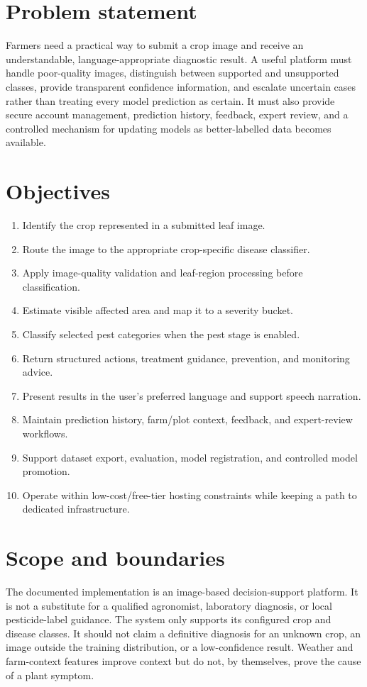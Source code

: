 \documentclass[12pt,a4paper,oneside,openany]{report}
\begin{document}
\section{Problem statement}
Farmers need a practical way to submit a crop image and receive an understandable, language-appropriate diagnostic result. A useful platform must handle poor-quality images, distinguish between supported and unsupported classes, provide transparent confidence information, and escalate uncertain cases rather than treating every model prediction as certain. It must also provide secure account management, prediction history, feedback, expert review, and a controlled mechanism for updating models as better-labelled data becomes available.

\section{Objectives}
\begin{enumerate}
  \item Identify the crop represented in a submitted leaf image.
  \item Route the image to the appropriate crop-specific disease classifier.
  \item Apply image-quality validation and leaf-region processing before classification.
  \item Estimate visible affected area and map it to a severity bucket.
  \item Classify selected pest categories when the pest stage is enabled.
  \item Return structured actions, treatment guidance, prevention, and monitoring advice.
  \item Present results in the user's preferred language and support speech narration.
  \item Maintain prediction history, farm/plot context, feedback, and expert-review workflows.
  \item Support dataset export, evaluation, model registration, and controlled model promotion.
  \item Operate within low-cost/free-tier hosting constraints while keeping a path to dedicated infrastructure.
\end{enumerate}

\section{Scope and boundaries}
The documented implementation is an image-based decision-support platform. It is not a substitute for a qualified agronomist, laboratory diagnosis, or local pesticide-label guidance. The system only supports its configured crop and disease classes. It should not claim a definitive diagnosis for an unknown crop, an image outside the training distribution, or a low-confidence result. Weather and farm-context features improve context but do not, by themselves, prove the cause of a plant symptom.
\end{document}
